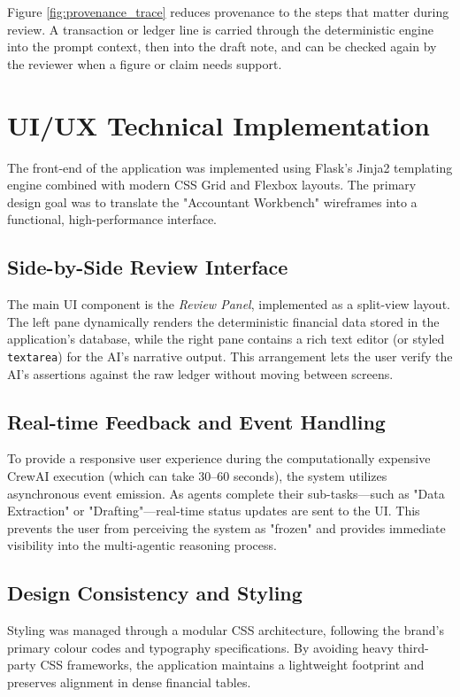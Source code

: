 Figure \ref{fig:provenance_trace} reduces provenance to the steps that matter during review. A transaction or ledger line is carried through the deterministic engine into the prompt context, then into the draft note, and can be checked again by the reviewer when a figure or claim needs support.

\section{UI/UX Technical Implementation}
The front-end of the application was implemented using Flask's Jinja2 templating engine combined with modern CSS Grid and Flexbox layouts. The primary design goal was to translate the "Accountant Workbench" wireframes into a functional, high-performance interface.

\subsection{Side-by-Side Review Interface}
The main UI component is the \textit{Review Panel}, implemented as a split-view layout. The left pane dynamically renders the deterministic financial data stored in the application's database, while the right pane contains a rich text editor (or styled \texttt{textarea}) for the AI's narrative output. This arrangement lets the user verify the AI's assertions against the raw ledger without moving between screens.

\subsection{Real-time Feedback and Event Handling}
To provide a responsive user experience during the computationally expensive CrewAI execution (which can take 30--60 seconds), the system utilizes asynchronous event emission. As agents complete their sub-tasks—such as "Data Extraction" or "Drafting"—real-time status updates are sent to the UI. This prevents the user from perceiving the system as "frozen" and provides immediate visibility into the multi-agentic reasoning process.

\subsection{Design Consistency and Styling}
Styling was managed through a modular CSS architecture, following the brand's primary colour codes and typography specifications. By avoiding heavy third-party CSS frameworks, the application maintains a lightweight footprint and preserves alignment in dense financial tables.
